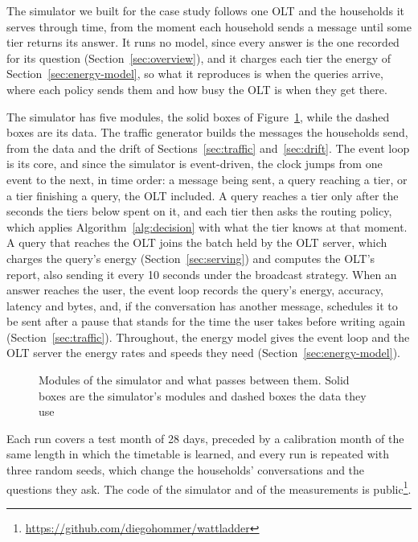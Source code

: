 \documentclass[cic,dipl,english]{infufrgs}
\begin{document}
The simulator we built for the case study follows one OLT and the households it serves
through time, from the moment
each household sends a message until some tier returns its answer. It runs no model,
since every answer is the one recorded for its question (Section~\ref{sec:overview}), and
it charges each tier the energy of Section~\ref{sec:energy-model}, so what it reproduces
is when the queries arrive, where each policy sends them and how busy the OLT is when
they get there.

The simulator has five modules, the solid boxes of Figure~\ref{fig:simulator}, while the dashed
boxes are its data. The traffic generator builds the
messages the households send, from the data and the drift of
Sections~\ref{sec:traffic} and~\ref{sec:drift}. The event loop is its core, and since the simulator
is event-driven, the clock jumps from one event to the next, in time
order: a message being sent, a query reaching a tier, or a tier finishing a query, the OLT
included. A query reaches a tier only after the seconds the tiers below spent on it, and each
tier then asks the routing policy, which applies Algorithm~\ref{alg:decision} with what the tier
knows at that moment. A query that reaches the OLT joins the batch held by the OLT server,
which charges the query's energy (Section~\ref{sec:serving}) and computes the OLT's report, also
sending it every 10 seconds under the broadcast strategy. When an answer reaches the user, the event loop records the query's
energy, accuracy, latency and bytes, and, if the conversation has another message, schedules it
to be sent after a pause that stands for the time the user takes before writing again
(Section~\ref{sec:traffic}). Throughout, the energy model gives the event loop and the OLT server the
energy rates and speeds they need (Section~\ref{sec:energy-model}).

\begin{figure}[htb]
  \centering
  \caption[Modules of the simulator and what passes between them]{Modules of the simulator and what passes between them.
  Solid boxes are the simulator's modules and dashed boxes the data they use}
  \label{fig:simulator}
  \vspace{6pt}
  
\end{figure}

Each run covers a test month of 28 days, preceded by a calibration month
of the same length in which the timetable is learned, and every run is repeated with
three random seeds, which change the households' conversations and the questions they
ask. The code of the simulator and of the measurements is
public\footnote{\url{https://github.com/diegohommer/wattladder}}.
\end{document}
